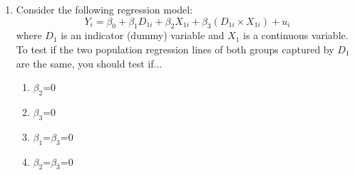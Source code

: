 \documentclass{article}
\begin{document}
\begin{enumerate}
    \item Consider the following regression model:
\begin{equation*}
    Y_i = \beta_0 + \beta_1 D_{1i} + \beta_2 X_{1i} + \beta_3 (D_{1i} \times X_{1i}) + u_i
\end{equation*}
where $D_1$ is an indicator (dummy) variable and $X_1$ is a continuous variable. To test if the two population regression lines of both groups captured by $D_1$ are the same, you should test if...
    \begin{enumerate}[label=\alph*)]
        \item $\beta_2$=0
        \item $\beta_3$=0
        \item $\beta_1$=$\beta_3$=0
        \item $\beta_2$=$\beta_3$=0
    \end{enumerate}\vspace{.25cm}




\end{enumerate}


\newpage
{}\\[2em]


\end{document}
